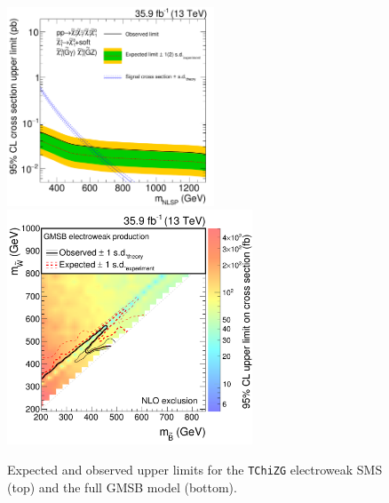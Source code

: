 \begin{figure}[btp]
 \centering
 \includegraphics[width=0.55\textwidth]{figures/EndorsementPlots/TChiNG_limit2}\\
 \vspace{\baselineskip}
 \includegraphics[width=0.65\textwidth]{figures/EndorsementPlots/GMSB_limits_XSEC2}
 \caption{Expected and observed upper limits for the \texttt{TChiZG} electroweak SMS (top) and the full GMSB model (bottom).}
 \label{fig:limitEWK}
\end{figure}

\newpage
